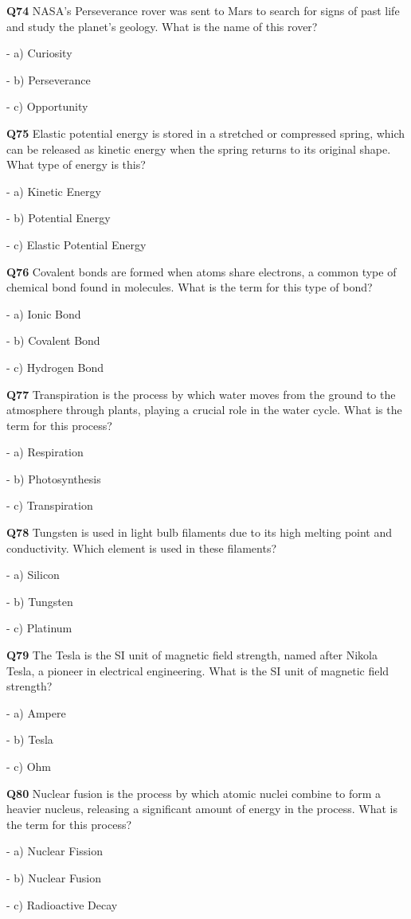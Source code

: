 \textbf{Q74} NASA's Perseverance rover was sent to Mars to search for signs of past life and study the planet's geology. What is the name of this rover?\par
\quad - a) Curiosity\par
\quad - b) Perseverance\par
\quad - c) Opportunity\par

\textbf{Q75} Elastic potential energy is stored in a stretched or compressed spring, which can be released as kinetic energy when the spring returns to its original shape. What type of energy is this?\par
\quad - a) Kinetic Energy\par
\quad - b) Potential Energy\par
\quad - c) Elastic Potential Energy\par

\textbf{Q76} Covalent bonds are formed when atoms share electrons, a common type of chemical bond found in molecules. What is the term for this type of bond?\par
\quad - a) Ionic Bond\par
\quad - b) Covalent Bond\par
\quad - c) Hydrogen Bond\par

\textbf{Q77} Transpiration is the process by which water moves from the ground to the atmosphere through plants, playing a crucial role in the water cycle. What is the term for this process?\par
\quad - a) Respiration\par
\quad - b) Photosynthesis\par
\quad - c) Transpiration\par

\textbf{Q78} Tungsten is used in light bulb filaments due to its high melting point and conductivity. Which element is used in these filaments?\par
\quad - a) Silicon\par
\quad - b) Tungsten\par
\quad - c) Platinum\par

\textbf{Q79} The Tesla is the SI unit of magnetic field strength, named after Nikola Tesla, a pioneer in electrical engineering. What is the SI unit of magnetic field strength?\par
\quad - a) Ampere\par
\quad - b) Tesla\par
\quad - c) Ohm\par

\textbf{Q80} Nuclear fusion is the process by which atomic nuclei combine to form a heavier nucleus, releasing a significant amount of energy in the process. What is the term for this process?\par
\quad - a) Nuclear Fission\par
\quad - b) Nuclear Fusion\par
\quad - c) Radioactive Decay\par